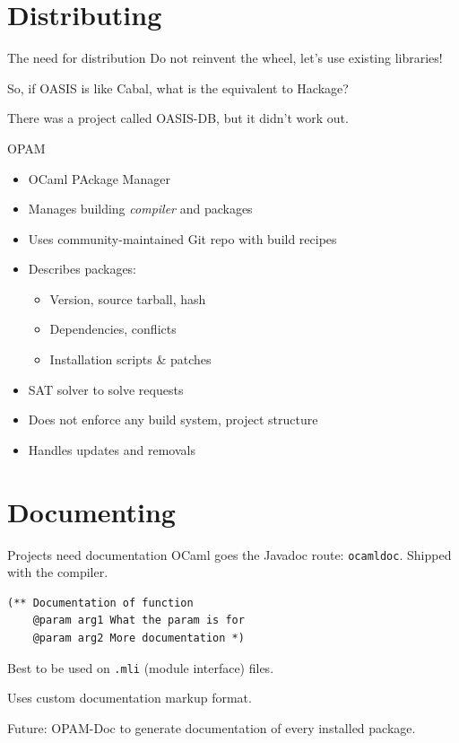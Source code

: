 \documentclass{beamer}
\begin{document}
\section{Distributing}

\begin{frame}{The need for distribution}
  Do not reinvent the wheel, let's use existing libraries!

  So, if OASIS is like Cabal, what is the equivalent to Hackage? \pause

  There was a project called OASIS-DB, but it didn't work out.
\end{frame}

\begin{frame}{OPAM}
  \begin{itemize}
    \item OCaml PAckage Manager
    \item Manages building \emph{compiler} and packages
    \item Uses community-maintained Git repo with build recipes
    \item Describes packages:
      \begin{itemize}
        \item Version, source tarball, hash
        \item Dependencies, conflicts
        \item Installation scripts \& patches
      \end{itemize}
    \item SAT solver to solve requests
    \item Does not enforce any build system, project structure
    \item Handles updates and removals
  \end{itemize}
\end{frame}

\section{Documenting}

\begin{frame}[fragile]{Projects need documentation}
  OCaml goes the Javadoc route: \texttt{ocamldoc}. Shipped with the compiler.
  \begin{verbatim}
(** Documentation of function
    @param arg1 What the param is for
    @param arg2 More documentation *)
  \end{verbatim}
  Best to be used on \texttt{.mli} (module interface) files.

  Uses custom documentation markup format.

  Future: OPAM-Doc to generate documentation of every installed package.
\end{frame}
\end{document}
